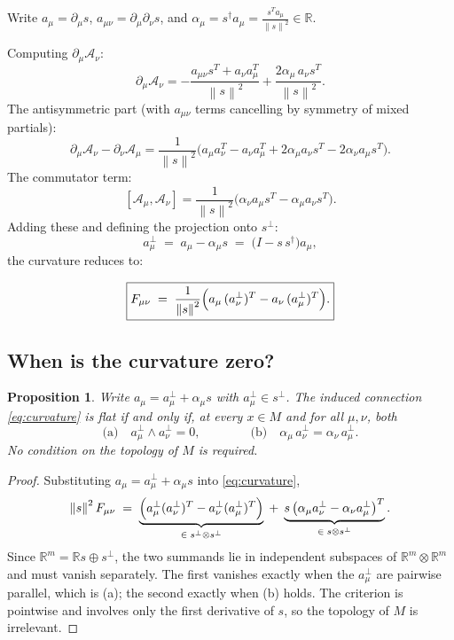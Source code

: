 \documentclass[11pt, a4paper]{article}
\theoremstyle{plain}
\newtheorem{proposition}[theorem]{Proposition}
\theoremstyle{definition}
\newcommand{\R}{\mathbb{R}}
\newcommand{\Sig}{\mathcal{A}}
\newcommand{\del}{\partial}
\newcommand{\norm}[1]{\left\|#1\right\|}
\begin{document}
Write $a_\mu = \del_\mu s$, $a_{\mu\nu} = \del_\mu\del_\nu s$, and
$\alpha_\mu = s^\dagger a_\mu = \frac{s^T a_\mu}{\norm{s}^2} \in \R$.

Computing $\del_\mu\Sig_\nu$:
\[
  \del_\mu\Sig_\nu
  = -\frac{a_{\mu\nu}s^T + a_\nu a_\mu^T}{\norm{s}^2}
    + \frac{2\alpha_\mu\,a_\nu s^T}{\norm{s}^2}.
\]
The antisymmetric part (with $a_{\mu\nu}$ terms cancelling by symmetry of mixed
partials):
\[
  \del_\mu\Sig_\nu - \del_\nu\Sig_\mu
  = \frac{1}{\norm{s}^2}
    \bigl(a_\mu a_\nu^T - a_\nu a_\mu^T
          + 2\alpha_\mu a_\nu s^T - 2\alpha_\nu a_\mu s^T\bigr).
\]
The commutator term:
\[
  [\Sig_\mu,\Sig_\nu]
  = \frac{1}{\norm{s}^2}
    \bigl(\alpha_\nu a_\mu s^T - \alpha_\mu a_\nu s^T\bigr).
\]
Adding these and defining the projection onto $s^\perp$:
\[
  a_\mu^\perp \;=\; a_\mu - \alpha_\mu s
  \;=\; \bigl(I - s\,s^\dagger\bigr)a_\mu,
\]
the curvature reduces to:

\begin{equation}\label{eq:curvature}
  \boxed{F_{\mu\nu}
  \;=\; \frac{1}{\norm{s}^2}
        \Bigl(a_\mu\,(a_\nu^\perp)^T - a_\nu\,(a_\mu^\perp)^T\Bigr).}
\end{equation}

\subsection{When is the curvature zero?}

\begin{proposition}\label{prop:flat-criterion}
Write $a_\mu = a_\mu^\perp + \alpha_\mu s$ with $a_\mu^\perp \in s^\perp$. The
induced connection \eqref{eq:curvature} is flat if and only if, at every
$x \in M$ and for all $\mu,\nu$, \emph{both}
\[
  \text{(a)}\quad a_\mu^\perp \wedge a_\nu^\perp = 0,
  \qquad\qquad
  \text{(b)}\quad \alpha_\mu\, a_\nu^\perp = \alpha_\nu\, a_\mu^\perp .
\]
No condition on the topology of $M$ is required.
\end{proposition}

\begin{proof}
Substituting $a_\mu = a_\mu^\perp + \alpha_\mu s$ into \eqref{eq:curvature},
\[
  \norm{s}^2 F_{\mu\nu}
  \;=\; \underbrace{\Bigl(a_\mu^\perp (a_\nu^\perp)^T - a_\nu^\perp (a_\mu^\perp)^T\Bigr)}_{\in\; s^\perp \otimes s^\perp}
  \;+\; \underbrace{s\,\bigl(\alpha_\mu a_\nu^\perp - \alpha_\nu a_\mu^\perp\bigr)^T}_{\in\; s \otimes s^\perp}.
\]
Since $\R^m = \R s \oplus s^\perp$, the two summands lie in independent subspaces
of $\R^m\otimes\R^m$ and must vanish separately. The first vanishes exactly when
the $a_\mu^\perp$ are pairwise parallel, which is (a); the second exactly when
(b) holds. The criterion is pointwise and involves only the first derivative of
$s$, so the topology of $M$ is irrelevant.
\end{proof}
\end{document}
